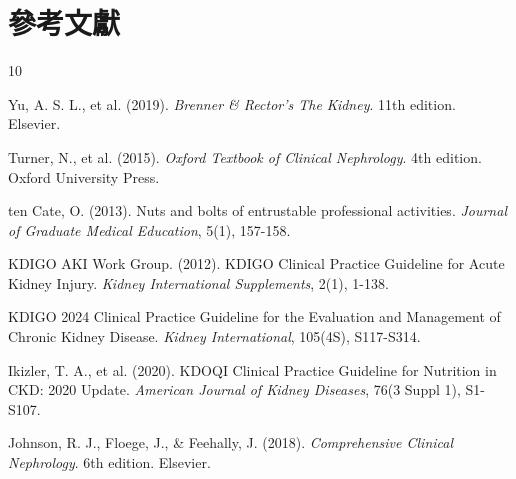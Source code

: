 \documentclass[12pt,a4paper]{article}
\begin{document}
\section{參考文獻}
\begin{thebibliography}{10}

Yu, A. S. L., et al. (2019). \textit{Brenner \& Rector's The Kidney}. 11th edition. Elsevier.

Turner, N., et al. (2015). \textit{Oxford Textbook of Clinical Nephrology}. 4th edition. Oxford University Press.

ten Cate, O. (2013). Nuts and bolts of entrustable professional activities. \textit{Journal of Graduate Medical Education}, 5(1), 157-158.

KDIGO AKI Work Group. (2012). KDIGO Clinical Practice Guideline for Acute Kidney Injury. \textit{Kidney International Supplements}, 2(1), 1-138.

KDIGO 2024 Clinical Practice Guideline for the Evaluation and Management of Chronic Kidney Disease. \textit{Kidney International}, 105(4S), S117-S314.

Ikizler, T. A., et al. (2020). KDOQI Clinical Practice Guideline for Nutrition in CKD: 2020 Update. \textit{American Journal of Kidney Diseases}, 76(3 Suppl 1), S1-S107.

Johnson, R. J., Floege, J., \& Feehally, J. (2018). \textit{Comprehensive Clinical Nephrology}. 6th edition. Elsevier.

\end{thebibliography}
\end{document}
